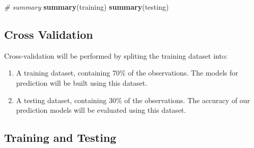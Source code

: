 \documentclass[]{article}
\newenvironment{Shaded}{\begin{snugshade}}{\end{snugshade}}
\newcommand{\CommentTok}[1]{\textcolor[rgb]{0.56,0.35,0.01}{\textit{#1}}}
\newcommand{\DataTypeTok}[1]{\textcolor[rgb]{0.13,0.29,0.53}{#1}}
\newcommand{\DecValTok}[1]{\textcolor[rgb]{0.00,0.00,0.81}{#1}}
\newcommand{\FloatTok}[1]{\textcolor[rgb]{0.00,0.00,0.81}{#1}}
\newcommand{\KeywordTok}[1]{\textcolor[rgb]{0.13,0.29,0.53}{\textbf{#1}}}
\newcommand{\NormalTok}[1]{#1}
\newcommand{\OperatorTok}[1]{\textcolor[rgb]{0.81,0.36,0.00}{\textbf{#1}}}
\newcommand{\OtherTok}[1]{\textcolor[rgb]{0.56,0.35,0.01}{#1}}
\newcommand{\StringTok}[1]{\textcolor[rgb]{0.31,0.60,0.02}{#1}}
\begin{document}
\begin{Shaded}
\begin{Highlighting}[]
\CommentTok{# summary}
\KeywordTok{summary}\NormalTok{(training)}
\KeywordTok{summary}\NormalTok{(testing)}
\end{Highlighting}
\end{Shaded}

\hypertarget{cross-validation}{%
\subsection{Cross Validation}\label{cross-validation}}

Cross-validation will be performed by spliting the training dataset
into:

\begin{enumerate}
\def\labelenumi{\arabic{enumi})}
\item
  A training dataset, containing 70\% of the observations. The models
  for prediction will be built using this dataset.
\item
  A testing dataset, containing 30\% of the observations. The accuracy
  of our prediction models will be evaluated using this dataset.
\end{enumerate}

\begin{Shaded}
\end{Shaded}

\hypertarget{training-and-testing}{%
\subsection{Training and Testing}\label{training-and-testing}}
\end{document}
